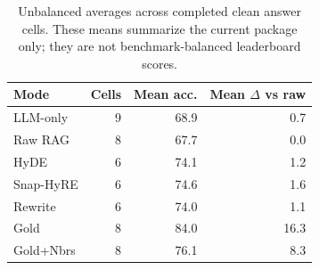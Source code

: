 \begin{table}[!htbp]
\centering
\caption{Unbalanced averages across completed clean answer cells. These means summarize the current package only; they are not benchmark-balanced leaderboard scores.}
\label{tab:completed_means}
\scriptsize
\setlength{\tabcolsep}{4pt}
\begin{tabular}{lrrr}
\toprule
Mode & Cells & Mean acc. & Mean $\Delta$ vs raw \\
\midrule
LLM-only & 9 & 68.9 & 0.7 \\
Raw RAG & 8 & 67.7 & 0.0 \\
HyDE & 6 & 74.1 & 1.2 \\
Snap-HyRE & 6 & 74.6 & 1.6 \\
Rewrite & 6 & 74.0 & 1.1 \\
Gold & 8 & 84.0 & 16.3 \\
Gold+Nbrs & 8 & 76.1 & 8.3 \\
\bottomrule
\end{tabular}
\end{table}
